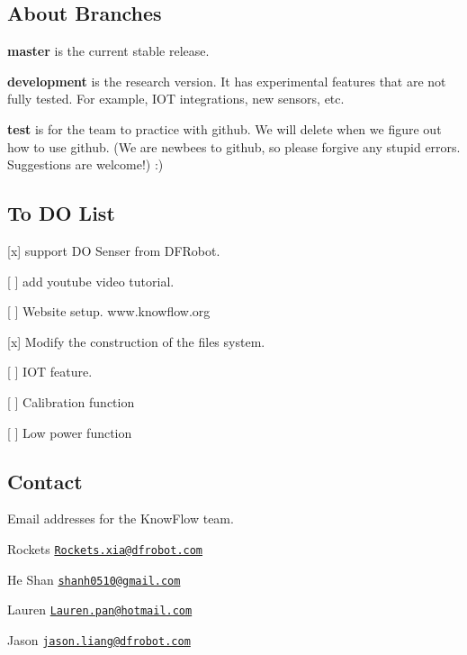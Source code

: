 \subsection*{About Branches}

{\bfseries master} is the current stable release.

{\bfseries development} is the research version. It has experimental features that are not fully tested. For example, I\+OT integrations, new sensors, etc.

{\bfseries test} is for the team to practice with github. We will delete when we figure out how to use github. (We are newbees to github, so please forgive any stupid errors. Suggestions are welcome!) \+:)

\subsection*{To DO List}


\begin{DoxyItemize}
\item \mbox{[}x\mbox{]} support DO Senser from D\+F\+Robot.
\item \mbox{[} \mbox{]} add youtube video tutorial.
\item \mbox{[} \mbox{]} Website setup. www.\+knowflow.\+org
\item \mbox{[}x\mbox{]} Modify the construction of the files system.
\item \mbox{[} \mbox{]} I\+OT feature.
\item \mbox{[} \mbox{]} Calibration function
\item \mbox{[} \mbox{]} Low power function
\end{DoxyItemize}

\subsection*{Contact}

Email addresses for the Know\+Flow team.


\begin{DoxyItemize}
\item Rockets \href{mailto:Rockets.xia@dfrobot.com}{\tt Rockets.\+xia@dfrobot.\+com}
\item He Shan \href{mailto:shanh0510@gmail.com}{\tt shanh0510@gmail.\+com}
\item Lauren \href{mailto:Lauren.pan@hotmail.com}{\tt Lauren.\+pan@hotmail.\+com}
\item Jason \href{mailto:jason.liang@dfrobot.com}{\tt jason.\+liang@dfrobot.\+com}
\end{DoxyItemize}

